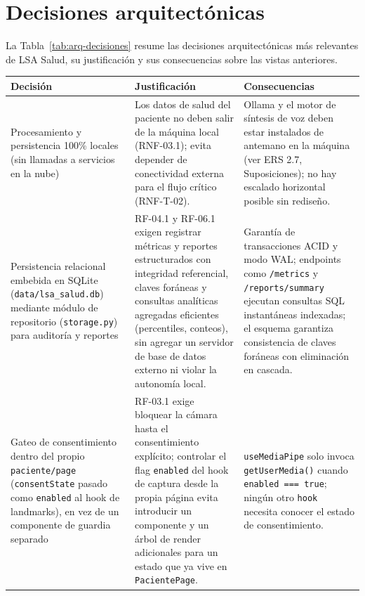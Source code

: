 \section{Decisiones arquitectónicas}
\label{sec:decisiones}

La Tabla~\ref{tab:arq-decisiones} resume las decisiones arquitectónicas más
relevantes de LSA Salud, su justificación y sus consecuencias sobre las
vistas anteriores.

\begin{longtable}{>{\raggedright\arraybackslash}p{4.25cm} >{\raggedright\arraybackslash}p{5.2cm} >{\raggedright\arraybackslash}p{5.2cm}}
    \toprule
    \textbf{Decisión} & \textbf{Justificación} & \textbf{Consecuencias} \\
    \midrule
    \endhead
    Procesamiento y persistencia 100\% locales (sin llamadas a servicios en
    la nube) &
    Los datos de salud del paciente no deben salir de la máquina local
    (RNF-03.1); evita depender de conectividad externa para el flujo crítico
    (RNF-T-02). &
    Ollama y el motor de síntesis de voz deben estar instalados de antemano
    en la máquina (ver ERS 2.7, Suposiciones); no hay escalado horizontal
    posible sin rediseño. \\

    Persistencia relacional embebida en SQLite (\texttt{data/lsa\_salud.db})
    mediante módulo de repositorio (\texttt{storage.py}) para auditoría y
    reportes &
    RF-04.1 y RF-06.1 exigen registrar métricas y reportes estructurados
    con integridad referencial, claves foráneas y consultas analíticas
    agregadas eficientes (percentiles, conteos), sin agregar un servidor
    de base de datos externo ni violar la autonomía local. &
    Garantía de transacciones ACID y modo WAL; endpoints como \texttt{/metrics}
    y \texttt{/reports/summary} ejecutan consultas SQL instantáneas indexadas;
    el esquema garantiza consistencia de claves foráneas con eliminación en cascada. \\

    Gateo de consentimiento dentro del propio \texttt{paciente/page}
    (\texttt{consentState} pasado como \texttt{enabled} al hook de
    landmarks), en vez de un componente de guardia separado &
    RF-03.1 exige bloquear la cámara hasta el consentimiento
    explícito; controlar el flag \texttt{enabled} del hook de captura desde
    la propia página evita introducir un componente y un árbol de render
    adicionales para un estado que ya vive en \texttt{PacientePage}. &
    \texttt{useMediaPipe} solo invoca \texttt{getUserMedia()} cuando
    \texttt{enabled === true}; ningún otro \texttt{hook} necesita conocer el
    estado de consentimiento. \\


\end{longtable}
